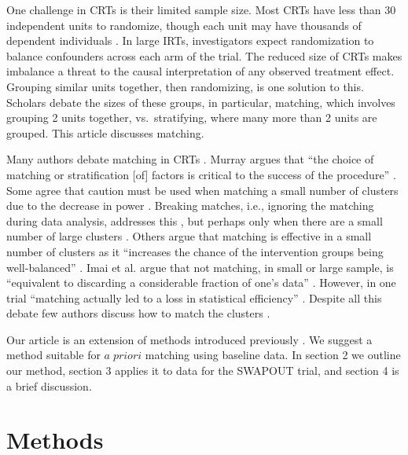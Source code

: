 \documentclass[]{article}
\begin{document}
One challenge in CRTs is their limited sample size. Most CRTs have less
than 30 independent units to randomize, though each unit may have
thousands of dependent individuals \citep{balzer2012match}. In large
IRTs, investigators expect randomization to balance confounders across
each arm of the trial. The reduced size of CRTs makes imbalance a threat
to the causal interpretation of any observed treatment effect. Grouping
similar units together, then randomizing, is one solution to this.
Scholars debate the sizes of these groups, in particular, matching,
which involves grouping 2 units together, vs.~stratifying, where many
more than 2 units are grouped\citep{PMVsStrat}. This article discusses
matching.

Many authors debate matching in CRTs
\citep{balzer2012match, CRTrials2009, gatsonis2017methods, diehr1995breaking, murray1998design, imai2009essential, PMVsStrat, donner2007merits, klar1997merits, donner2000design, martin1993effect}.
Murray argues that ``the choice of matching or stratification {[}of{]}
factors is critical to the success of the procedure''
\citep{murray1998design}. Some agree that caution must be used when
matching a small number of clusters due to the decrease in power
\citep{donner2000design, klar1997merits, balzer2012match, martin1993effect}.
Breaking matches, i.e., ignoring the matching during data analysis,
addresses this \citep{diehr1995breaking}, but perhaps only when there
are a small number of large clusters \citep{donner2007merits}. Others
argue that matching is effective in a small number of clusters as it
``increases the chance of the intervention groups being well-balanced''
\citep{donner2007merits}. Imai et al. argue that not matching, in small
or large sample, is ``equivalent to discarding a considerable fraction
of one's data'' \citep{imai2009essential}. However, in one trial
``matching actually led to a loss in statistical efficiency''
\citep[\citet{donner2000design}]{manun1994influence}. Despite all this
debate few authors discuss how to match the clusters
\citep{raab2001balance}.

Our article is an extension of methods introduced previously
\citep{gatsonis2017methods}. We suggest a method suitable for
\(a \; priori\) matching using baseline data. In section 2 we outline
our method, section 3 applies it to data for the SWAPOUT trial, and
section 4 is a brief discussion.

\section{Methods }\label{methods}
\end{document}
